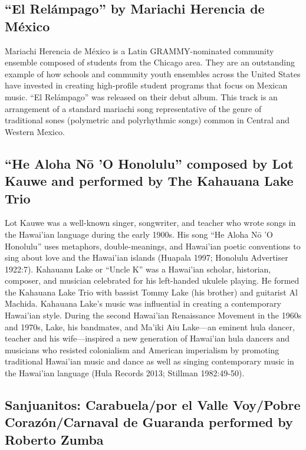 \documentclass[twoside]{article}
\begin{document}
\hypertarget{el-reluxe1mpago-by-mariachi-herencia-de-muxe9xico}{%
\subsection*{``El Relámpago'' by Mariachi Herencia de
México}\label{el-reluxe1mpago-by-mariachi-herencia-de-muxe9xico}}

Mariachi Herencia de México is a Latin GRAMMY-nominated community
ensemble composed of students from the Chicago area. They are an
outstanding example of how schools and community youth ensembles across
the United States have invested in creating high-profile student
programs that focus on Mexican music. ``El Relámpago'' was released on
their debut album. This track is an arrangement of a standard mariachi
song representative of the genre of traditional sones (polymetric and
polyrhythmic songs) common in Central and Western Mexico.

\hypertarget{he-aloha-nux14d-o-honolulu-composed-by-lot-kauwe-and-performed-by-the-kahauana-lake-trio}{%
\subsection*{``He Aloha Nō 'O Honolulu'' composed by Lot Kauwe and
performed by The Kahauana Lake
Trio}\label{he-aloha-nux14d-o-honolulu-composed-by-lot-kauwe-and-performed-by-the-kahauana-lake-trio}}

Lot Kauwe was a well-known singer, songwriter, and teacher who wrote
songs in the Hawai'ian language during the early 1900s. His song ``He
Aloha Nō 'O Honolulu'' uses metaphors, double-meanings, and Hawai'ian
poetic conventions to sing about love and the Hawai'ian islands (Huapala
1997; Honolulu Advertiser 1922:7). Kahauanu Lake or ``Uncle K'' was a
Hawai'ian scholar, historian, composer, and musician celebrated for his
left-handed ukulele playing. He formed the Kahauana Lake Trio with
bassist Tommy Lake (his brother) and guitarist Al Machida. Kahauana
Lake's music was influential in creating a contemporary Hawai'ian style.
During the second Hawai'ian Renaissance Movement in the 1960s and 1970s,
Lake, his bandmates, and Ma'iki Aiu Lake---an eminent hula dancer,
teacher and his wife---inspired a new generation of Hawai'ian hula
dancers and musicians who resisted colonialism and American imperialism
by promoting traditional Hawai'ian music and dance as well as singing
contemporary music in the Hawai'ian language (Hula Records 2013;
Stillman 1982:49-50).

\hypertarget{sanjuanitos-carabuelapor-el-valle-voypobre-corazuxf3ncarnaval-de-guaranda-performed-by-roberto-zumba}{%
\subsection*{Sanjuanitos: Carabuela/por el Valle Voy/Pobre
Corazón/\break Carnaval de Guaranda performed by Roberto
Zumba}\label{sanjuanitos-carabuelapor-el-valle-voypobre-corazuxf3ncarnaval-de-guaranda-performed-by-roberto-zumba}}
\end{document}
